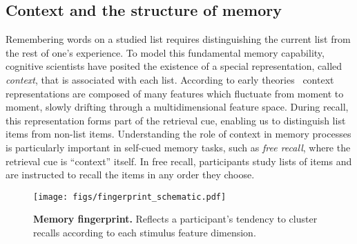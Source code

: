 \subsection*{Context and the structure of memory} 

Remembering words on a studied list requires distinguishing the current list
from the rest of one's experience. To model this fundamental memory capability,
cognitive scientists have posited the existence of a special representation,
called \emph{context}, that is associated with each list. According to early
theories~\citep[e.g.][]{Este55a,AndeBowe72} context representations are
composed of many features which fluctuate from moment to moment, slowly
drifting through a multidimensional feature space. During recall, this
representation forms part of the retrieval cue, enabling us to distinguish list
items from non-list items. Understanding the role of context in memory
processes is particularly important in self-cued memory tasks, such as
\textit{free recall}, where the retrieval cue is ``context'' itself. In free
recall, participants study lists of items and are instructed to recall the
items in any order they choose.

\begin{wrapfigure}[10]{r}{1.3in}
  \begin{center}
    \vspace{-33pt}
    \texttt{[image: figs/fingerprint\_schematic.pdf]}
  \end{center}
  \vspace{-18pt}
  \caption{\footnotesize \textbf{Memory fingerprint.}  Reflects a participant's tendency to cluster recalls according to each stimulus feature dimension.}
  \label{fig:fingerprint}
\end{wrapfigure}

